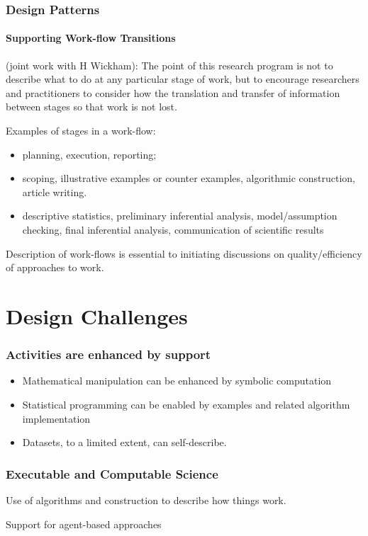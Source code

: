 \documentclass{beamer}
\begin{document}
\begin{frame}
  \frametitle{Design Patterns}
  \framesubtitle{Supporting Work-flow Transitions}
  
  (joint work with H Wickham): The point of this research program is
  not to describe what to do at any particular stage of work, but to
  encourage researchers and practitioners to consider how the
  translation and transfer of information between stages so that work
  is not lost.

  Examples of stages in a work-flow:
  \begin{itemize}
  \item planning, execution, reporting;
  \item scoping, illustrative examples or counter examples, algorithmic construction,
    article writing.
  \item descriptive statistics, preliminary inferential analysis,
    model/assumption checking, final inferential analysis,
    communication of scientific results
  \end{itemize}
  Description of work-flows is essential to initiating discussions on
  quality/efficiency of approaches to work.
\end{frame}

\section{Design Challenges}

\begin{frame}
  \frametitle{Activities are enhanced by support}

  \begin{itemize}
  \item Mathematical manipulation can be enhanced by symbolic
    computation
  \item Statistical programming can be enabled by examples and related
    algorithm implementation
  \item Datasets, to a limited extent, can self-describe.
  \end{itemize}
\end{frame}

\begin{frame}
  \frametitle{Executable and Computable Science}
  
  Use of algorithms and construction to describe how things work.

  Support for agent-based approaches
\end{frame}
\end{document}
